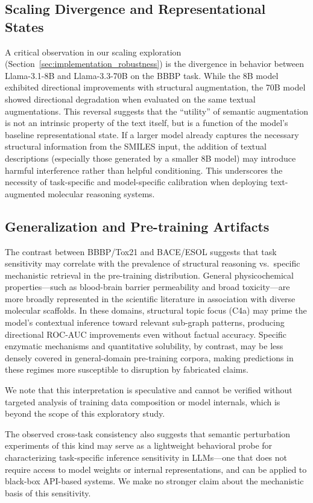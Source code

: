 \subsection{Scaling Divergence and Representational States}
A critical observation in our scaling exploration (Section~\ref{sec:implementation_robustness}) is the divergence in behavior between Llama-3.1-8B and Llama-3.3-70B on the BBBP task. While the 8B model exhibited directional improvements with structural augmentation, the 70B model showed directional degradation when evaluated on the same textual augmentations. This reversal suggests that the ``utility'' of semantic augmentation is not an intrinsic property of the text itself, but is a function of the model's baseline representational state. If a larger model already captures the necessary structural information from the SMILES input, the addition of textual descriptions (especially those generated by a smaller 8B model) may introduce harmful interference rather than helpful conditioning. This underscores the necessity of task-specific and model-specific calibration when deploying text-augmented molecular reasoning systems.

\subsection{Generalization and Pre-training Artifacts}
The contrast between BBBP/Tox21 and BACE/ESOL suggests that 
task sensitivity may correlate with the prevalence of 
structural reasoning vs.\ specific mechanistic retrieval 
in the pre-training distribution. General physicochemical 
properties---such as blood-brain barrier permeability and 
broad toxicity---are more broadly represented in the 
scientific literature in association with diverse molecular 
scaffolds. In these domains, structural topic focus (C4a) 
may prime the model's contextual inference toward relevant 
sub-graph patterns, producing directional ROC-AUC 
improvements even without factual accuracy. Specific enzymatic mechanisms and 
quantitative solubility, by contrast, may be less densely 
covered in general-domain pre-training corpora, making 
predictions in these regimes more susceptible to disruption 
by fabricated claims.

We note that this interpretation is speculative and cannot 
be verified without targeted analysis of training data 
composition or model internals, which is beyond the scope 
of this exploratory study.

The observed cross-task consistency also suggests that 
semantic perturbation experiments of this kind may serve 
as a lightweight behavioral probe for characterizing 
task-specific inference sensitivity in LLMs---one that 
does not require access to model weights or internal 
representations, and can be applied to black-box API-based 
systems. We make no stronger claim about the mechanistic 
basis of this sensitivity.

